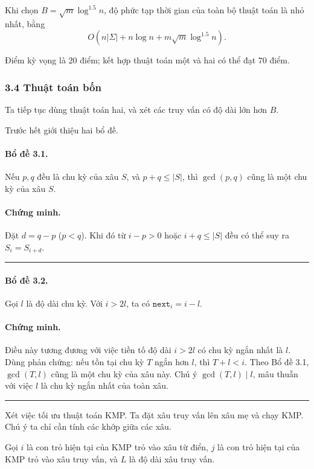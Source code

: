 \documentclass[11pt]{article}
\newcommand{\qedmark}{\hfill\rule{0.7ex}{0.7ex}}
\begin{document}
Khi chọn \(B=\sqrt{m}\log^{1.5}n\), độ phức tạp thời gian của toàn bộ thuật
toán là nhỏ nhất, bằng
\[
  O\left(n|\Sigma|+n\log n+m\sqrt{m}\log^{1.5}n\right).
\]

Điểm kỳ vọng là \(20\) điểm; kết hợp thuật toán một và hai có thể đạt \(70\)
điểm.

\subsubsection*{3.4 Thuật toán bốn}

Ta tiếp tục dùng thuật toán hai, và xét các truy vấn có độ dài lớn hơn \(B\).

Trước hết giới thiệu hai bổ đề.

\paragraph{Bổ đề 3.1.}
Nếu \(p,q\) đều là chu kỳ của xâu \(S\), và \(p+q\le |S|\), thì
\(\gcd(p,q)\) cũng là một chu kỳ của xâu \(S\).

\paragraph{Chứng minh.}
Đặt \(d=q-p\) (\(p<q\)). Khi đó từ \(i-p>0\) hoặc \(i+q\le |S|\) đều có thể suy
ra \(S_i=S_{i+d}\). \qedmark

\paragraph{Bổ đề 3.2.}
Gọi \(l\) là độ dài chu kỳ. Với \(i>2l\), ta có \(\texttt{next}_i=i-l\).

\paragraph{Chứng minh.}
Điều này tương đương với việc tiền tố độ dài \(i>2l\) có chu kỳ ngắn nhất là
\(l\). Dùng phản chứng: nếu tồn tại chu kỳ \(T\) ngắn hơn \(l\), thì
\(T+l<i\). Theo Bổ đề 3.1, \(\gcd(T,l)\) cũng là một chu kỳ của xâu này. Chú ý
\(\gcd(T,l)\mid l\), mâu thuẫn với việc \(l\) là chu kỳ ngắn nhất của toàn xâu.
\qedmark

Xét việc tối ưu thuật toán KMP. Ta đặt xâu truy vấn lên xâu mẹ và chạy KMP. Chú
ý ta chỉ cần tính các khớp giữa các xâu.

Gọi \(i\) là con trỏ hiện tại của KMP trỏ vào xâu từ điển, \(j\) là con trỏ
hiện tại của KMP trỏ vào xâu truy vấn, và \(L\) là độ dài xâu truy vấn.
\end{document}
